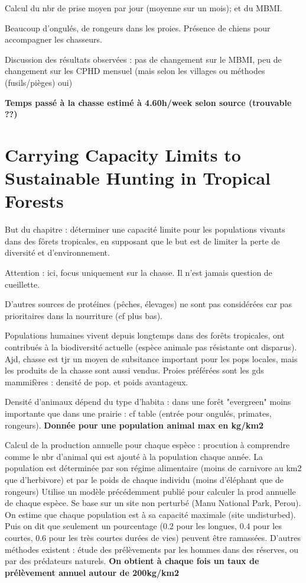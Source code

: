 \documentclass{article}
\begin{document}
Calcul du nbr de prise moyen par jour (moyenne sur un mois); et du MBMI.

Beaucoup d'ongulés, de rongeurs dans les proies. Présence de chiens pour accompagner les chasseurs.

Discussion des résultats observées : pas de changement sur le MBMI, peu de changement sur les CPHD mensuel (mais selon les villages ou méthodes (fusils/pièges) oui)

\textbf{Temps passé à la chasse estimé à 4.60h/week selon source (trouvable ??)}

\section{Carrying Capacity Limits to Sustainable Hunting in Tropical Forests}
But du chapitre : déterminer une capacité limite pour les populations vivants dans des fôrets tropicales, en supposant que le but est de limiter la perte de diversité et d'environnement.

Attention : ici, focus uniquement sur la chasse. Il n'est jamais question de cueillette.

D'autres sources de protéines (pêches, élevages) ne sont pas considérées car pas prioritaires dans la nourriture (cf plus bas).

Populations humaines vivent depuis longtemps dans des forêts tropicales, ont contribués à la biodiversité actuelle (espèce animale pas résistante ont disparus). Ajd, chasse est tjr un moyen de subsitance important pour les pops locales, mais les produits de la  chasse sont aussi vendus. Proies préférées sont les gds mammifères : densité de pop. et poids avantageux.

Densité d'animaux dépend du type d'habita : dans une forêt "evergreen" moins importante que dans une prairie : cf table (entrée pour ongulés, primates, rongeurs). \textbf{Donnée pour une population animal max en kg/km2}

Calcul de la production annuelle pour chaque espèce : procution à comprendre comme le nbr d'animal qui est ajouté à la population chaque année.
La population est déterminée par son régime alimentaire (moins de carnivore au km2 que d'herbivore) et par le poids de chaque individu (moins d'éléphant que de rongeurs)
Utilise un modèle précédemment publié pour calculer la prod annuelle de chaque espèce. Se base sur un site non perturbé (Manu National Park, Perou). On estime que chaque population est à sa capacité maximale (site undisturbed). Puis on dit que seulement un pourcentage (0.2 pour les longues, 0.4 pour les courtes, 0.6 pour les très courtes durées de vies) peuvent être ramassées.
D'autres méthodes existent : étude des prélèvements par les hommes dans des réserves, ou par des prédateurs naturels. \textbf{On obtient à chaque fois un taux de prélèvement annuel autour de 200kg/km2}
\end{document}

